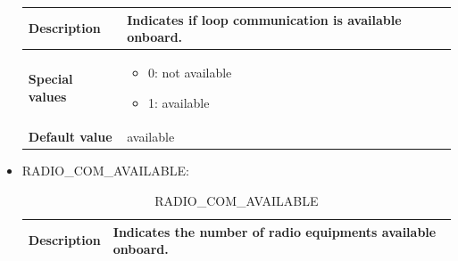 \documentclass{template/openetcs}
\begin{document}
\begin{itemize}
\begin{longtable}{|l|l|}
					\begin{minipage}[t]{0.22\linewidth} \textbf{Description}	\end{minipage} 
				&	\begin{minipage}[t]{0.78\linewidth} Indicates if loop communication is available onboard. \end{minipage} \\
				
				\hline
																																									
					\begin{minipage}[t]{0.22\linewidth} \textbf{Special values}	\end{minipage} 
				&	\begin{minipage}[t]{0.78\linewidth} \begin{itemize} \item 0: not available \item 1: available \end{itemize} \end{minipage} \\
				
				\hline
				
					\begin{minipage}[t]{0.22\linewidth} \textbf{Default value}	\end{minipage} 
				&	\begin{minipage}[t]{0.78\linewidth} available \end{minipage} \\
				
				\hline
				
			\end{longtable}
			
		\item RADIO\_COM\_AVAILABLE:
				
			\begin{longtable}{|l|l|}
				\caption{RADIO\_COM\_AVAILABLE}\\ 
				\hline
				
					\begin{minipage}[t]{0.22\linewidth} \textbf{Description}	\end{minipage} 
				&	\begin{minipage}[t]{0.78\linewidth} Indicates the number of radio equipments available onboard. \end{minipage} \\
				
				\hline
																																									

\end{longtable}
\end{itemize}
\end{document}
